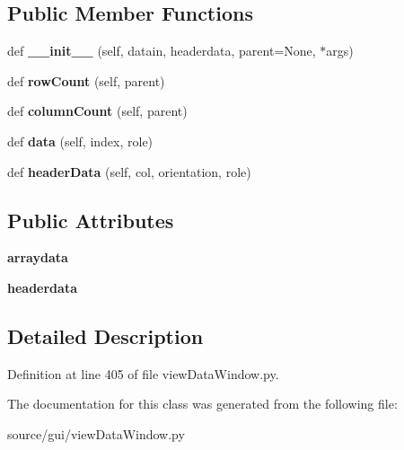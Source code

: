 \subsection*{Public Member Functions}
\begin{DoxyCompactItemize}
\item 
\mbox{\label{classview_data_window_1_1_my_table_model_a1243a0dc3f6de9cfb7cc22f8c76e7d17}} 
def {\bfseries \+\_\+\+\_\+init\+\_\+\+\_\+} (self, datain, headerdata, parent=None, $\ast$args)
\item 
\mbox{\label{classview_data_window_1_1_my_table_model_ab9e7949b825cfab710f6c89196d17440}} 
def {\bfseries row\+Count} (self, parent)
\item 
\mbox{\label{classview_data_window_1_1_my_table_model_a9a7c44d732e16b3e3906f8f4f258035c}} 
def {\bfseries column\+Count} (self, parent)
\item 
\mbox{\label{classview_data_window_1_1_my_table_model_a9110db098260423bf55048e9276e176a}} 
def {\bfseries data} (self, index, role)
\item 
\mbox{\label{classview_data_window_1_1_my_table_model_af9e0a505edbe968cb72ddc70fc9d9e6f}} 
def {\bfseries header\+Data} (self, col, orientation, role)
\end{DoxyCompactItemize}
\subsection*{Public Attributes}
\begin{DoxyCompactItemize}
\item 
\mbox{\label{classview_data_window_1_1_my_table_model_a36967e99af82d590dc93453fbbaf6e03}} 
{\bfseries arraydata}
\item 
\mbox{\label{classview_data_window_1_1_my_table_model_ade630778d9d53f11eb1f40f50639b00d}} 
{\bfseries headerdata}
\end{DoxyCompactItemize}


\subsection{Detailed Description}


Definition at line 405 of file view\+Data\+Window.\+py.



The documentation for this class was generated from the following file\+:\begin{DoxyCompactItemize}
\item 
source/gui/view\+Data\+Window.\+py\end{DoxyCompactItemize}
